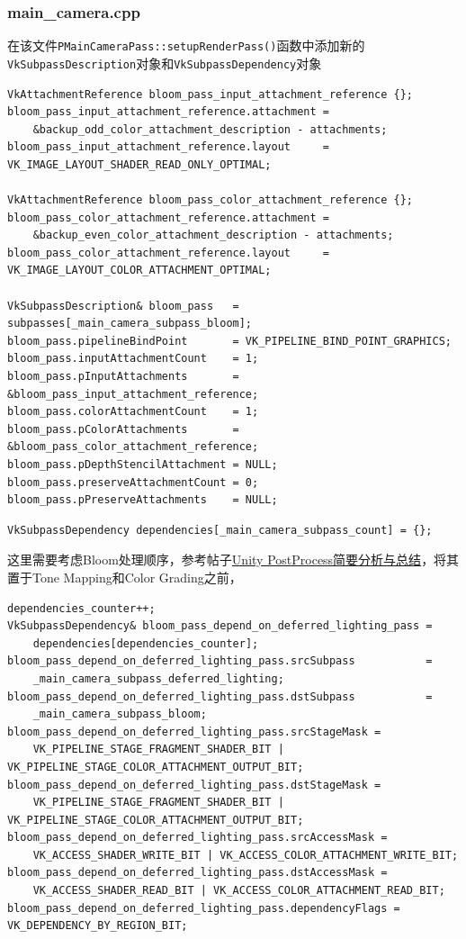 \documentclass{ctexart}
\begin{document}
    \subsubsection{main\_camera.cpp}
    在该文件\verb|PMainCameraPass::setupRenderPass()|函数中添加新的\verb|VkSubpassDescription|对象和\verb|VkSubpassDependency|对象
    \begin{verbatim}
VkAttachmentReference bloom_pass_input_attachment_reference {};
bloom_pass_input_attachment_reference.attachment = 
    &backup_odd_color_attachment_description - attachments;
bloom_pass_input_attachment_reference.layout     = VK_IMAGE_LAYOUT_SHADER_READ_ONLY_OPTIMAL;

VkAttachmentReference bloom_pass_color_attachment_reference {};
bloom_pass_color_attachment_reference.attachment = 
    &backup_even_color_attachment_description - attachments;
bloom_pass_color_attachment_reference.layout     = VK_IMAGE_LAYOUT_COLOR_ATTACHMENT_OPTIMAL;

VkSubpassDescription& bloom_pass   = subpasses[_main_camera_subpass_bloom];
bloom_pass.pipelineBindPoint       = VK_PIPELINE_BIND_POINT_GRAPHICS;
bloom_pass.inputAttachmentCount    = 1;
bloom_pass.pInputAttachments       = &bloom_pass_input_attachment_reference;
bloom_pass.colorAttachmentCount    = 1;
bloom_pass.pColorAttachments       = &bloom_pass_color_attachment_reference;
bloom_pass.pDepthStencilAttachment = NULL;
bloom_pass.preserveAttachmentCount = 0;
bloom_pass.pPreserveAttachments    = NULL;
    \end{verbatim}
    \begin{verbatim}
VkSubpassDependency dependencies[_main_camera_subpass_count] = {};
    \end{verbatim}
    这里需要考虑Bloom处理顺序，参考帖子\href{https://zhuanlan.zhihu.com/p/118557378}{Unity PostProcess简要分析与总结}，将其置于Tone Mapping和Color Grading之前，
    \begin{verbatim}
dependencies_counter++;
VkSubpassDependency& bloom_pass_depend_on_deferred_lighting_pass = 
    dependencies[dependencies_counter];
bloom_pass_depend_on_deferred_lighting_pass.srcSubpass           = 
    _main_camera_subpass_deferred_lighting;
bloom_pass_depend_on_deferred_lighting_pass.dstSubpass           = 
    _main_camera_subpass_bloom;
bloom_pass_depend_on_deferred_lighting_pass.srcStageMask = 
    VK_PIPELINE_STAGE_FRAGMENT_SHADER_BIT | VK_PIPELINE_STAGE_COLOR_ATTACHMENT_OUTPUT_BIT;
bloom_pass_depend_on_deferred_lighting_pass.dstStageMask =
    VK_PIPELINE_STAGE_FRAGMENT_SHADER_BIT | VK_PIPELINE_STAGE_COLOR_ATTACHMENT_OUTPUT_BIT;
bloom_pass_depend_on_deferred_lighting_pass.srcAccessMask =
    VK_ACCESS_SHADER_WRITE_BIT | VK_ACCESS_COLOR_ATTACHMENT_WRITE_BIT;
bloom_pass_depend_on_deferred_lighting_pass.dstAccessMask =
    VK_ACCESS_SHADER_READ_BIT | VK_ACCESS_COLOR_ATTACHMENT_READ_BIT;
bloom_pass_depend_on_deferred_lighting_pass.dependencyFlags = VK_DEPENDENCY_BY_REGION_BIT;
    \end{verbatim}
\end{document}
